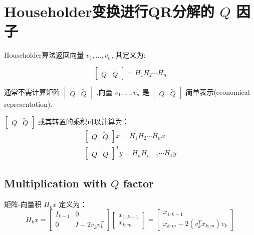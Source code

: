 \section{Householder变换进行QR分解的 $Q$ 因子}

Householder算法返回向量 $ v_{1}, \ldots, v_{n} $, 其定义为:

\begin{definition}
   \begin{equation}
\left[\begin{array}{ll}
Q & \tilde{Q}
\end{array}\right]=H_{1} H_{2} \cdots H_{n}
\end{equation} 
\end{definition}

通常不需计算矩阵 $ \left[\begin{array}{ll}Q & \tilde{Q}\end{array}\right] $ .向量 $ v_{1}, \ldots, v_{n} $ 是 $ \left[\begin{array}{ll}Q & \tilde{Q}\end{array}\right] $ 简单表示(economical representation).

\begin{theorem}
    $ \left[\begin{array}{ll}Q & \tilde{Q}\end{array}\right] $ 或其转置的乘积可以计算为：
\begin{equation}
\begin{array}{c}
{\left[\begin{array}{cc}
Q & \tilde{Q}
\end{array}\right] x=H_{1} H_{2} \cdots H_{n} x} \\
{\left[\begin{array}{ll}
Q & \tilde{Q}
\end{array}\right]^{T} y=H_{n} H_{n-1} \cdots H_{1} y}
\end{array}
\end{equation}
\end{theorem}

\subsection{Multiplication with $Q$ factor}

\begin{definition}[矩阵-向量积 $ H_{k} x $]
    矩阵-向量积 $ H_{k} x $ 定义为：
\begin{equation}
H_{k} x=\left[\begin{array}{cc}
I_{k-1} & 0 \\
0 & I-2 v_{k} v_{k}^{T}
\end{array}\right]\left[\begin{array}{c}
x_{1: k-1} \\
x_{k: m}
\end{array}\right]=\left[\begin{array}{c}
x_{1: k-1} \\
x_{k: m}-2\left(v_{k}^{T} x_{k: m}\right) v_{k}
\end{array}\right]
\end{equation}
\end{definition}

